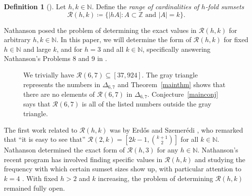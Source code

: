 \documentclass[10pt,a4paper]{article}
\theoremstyle{definition}
\newtheorem{definition}[theorem]{Definition}
\theoremstyle{remark}
\numberwithin{equation}{section}
\numberwithin{theorem}{section}
\newcommand{\N}{\mathbb{N}}
\newcommand{\Z}{\mathbb{Z}}
\newcommand{\calr}{\mathcal{R}}
\begin{document}
\begin{definition}[\cite{nathanson25Problems}]
    Let $h, k \in \N$. Define the \emph{range of cardinalities of $h$-fold sumsets } \[\mathcal{R}(h,k) \coloneq  \{|hA| : A \subset \Z \text{ and } |A| = k\}.\]
\end{definition}

Nathanson \cite{nathanson25Problems} posed the problem of determining the exact values in $\mathcal{R}(h,k)$ for arbitrary $h,k \in \N$. In this paper, we will determine the form of $\mathcal{R}(h,k)$ for fixed $h \in \N$ and large $k$, and for $h=3$ and all $k \in \N$, specifically answering Nathanson's Problems 8 and 9 in \cite{nathanson25Problems}.

\begin{figure}[h]
\begin{center}
\end{center}
\caption{We trivially have $\mathcal{R}(6,7) \subseteq [37,924]$. The gray triangle represents the numbers in $\Delta_{6,7}$ and Theorem~\ref{mainthm} shows that there are no elements of $\mathcal{R}(6,7)$ in $\Delta_{6,7}$. Conjecture~\ref{mainconj} says that $\calr(6,7)$ is all of the listed numbers outside the gray triangle.}\label{figure1}
\end{figure}

The first work related to $\calr(h,k)$ was by Erd\H{o}s and Szemer\'edi \cite{ES83}, who remarked that ``it is easy to see that'' $\mathcal{R}(2,k) = \left[2k-1,\binom{k+1}{2}\right]$ for all $k \in \N$. Nathanson \cite{nathanson25Problems} determined the exact form of $\calr(h,3)$  for any 
$h \in \N$. Nathanson's recent program has involved finding specific values in $\calr(h,k)$ and studying the frequency with which certain sumset sizes show 
up, with particular attention to $k=4$ 
\cite{nathanson2025additivesumsetsizestetrahedral,nathanson2025explicitsumsetsizesadditive,nathanson25Problems,nathanson2025triangulartetrahedralnumberdifferences,nathanson2025compressioncomplexitysumsetsizes,obryant2025nathansonstriangularnumberphenomenon}. With fixed $h>2$ and $k$ increasing, the problem of determining $\calr(h,k)$ remained fully open.
\end{document}
